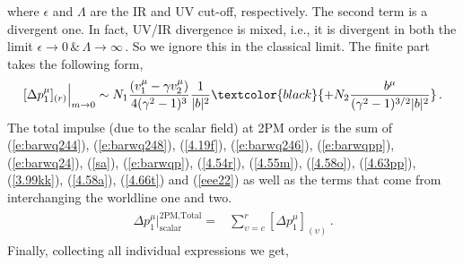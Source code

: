 \vspace{-0 cm}
where $\epsilon$ and $\Lambda$ are the IR and UV cut-off, respectively. The second term is a divergent one. In fact, UV/IR  divergence is mixed, i.e., it is divergent in both the limit  ${\epsilon}\rightarrow 0 \,\& \,\Lambda\rightarrow \infty\,.$ So we ignore this in the classical limit. The finite part takes the following form,
\begin{align}
    \begin{split}
    [\Delta p_1^{\mu}]_{(r)} \Big|_{m\to 0}\sim N_1\frac{(v_1^{\mu}-\gamma v_2^{\mu})}{4(\gamma^2-1)^3} \frac{1}{|b|^2}\textcolor{black}{+N_2 \frac{b^\mu}{(\gamma^2-1)^{3/2}|b|^2}}\,.
    \end{split}
\end{align}
The total impulse (due to the scalar field) at 2PM order is the sum of  (\ref{e:barwq244}), (\ref{e:barwq248}), (\ref{4.19f}), (\ref{e:barwq246}), (\ref{e:barwqpp}), (\ref{e:barwq24}), (\ref{sa}), (\ref{e:barwqp}), (\ref{4.54r}), (\ref{4.55m}), (\ref{4.58o}), (\ref{4.63pp}), (\ref{3.99kk}), (\ref{4.58a}), (\ref{4.66t}) and (\ref{eee22}) as well as the terms that come from interchanging the worldline one and two. 
\begin{align}
\begin{split}
     \Delta p_1^{\mu}\Big|^{\textrm{2PM}, \textrm{Total}}_{\textrm{scalar}}= & \sum_{\upsilon=c}^{r}[\Delta p_1^{\mu}]_{(\upsilon)}\,.
     \end{split}
\end{align}
\newpage
Finally, collecting all individual expressions we get,
